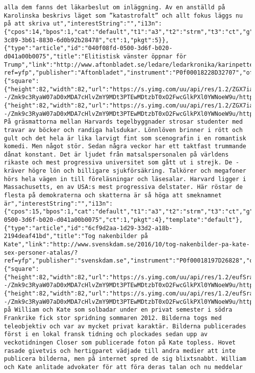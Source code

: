 \begin{verbatim}
alla dem fanns det läkarbeslut om inläggning. Av en anställd på Karolinska beskrivs läget som ”katastrofalt” och allt fokus läggs nu på att skriva ut","interestString":"","i13n":{"cpos":14,"bpos":1,"cat":"default","t1":"a3","t2":"strm","t3":"ct","g":"6266a514-3c89-3b61-8830-6d0b92b28478","ct":1,"pkgt":5}},{"type":"article","id":"040f08fd-0500-3d6f-b020-d041a00b0075","title":"Elitistisk vänster öppnar för Trump","link":"http://www.aftonbladet.se/ledare/ledarkronika/karinpettersson/article23796044.ab?ref=yfp","publisher":"Aftonbladet","instrument":"P0f00018228D32707","off_network":true,"images":{"square":{"height":82,"width":82,"url":"https://s.yimg.com/uu/api/res/1.2/ZGX7iaittAYy2niMtKGyXw--/Zmk9c3RyaW07aD0xMDA7cHlvZmY9MDt3PTEwMDtzbT0xO2FwcGlkPXl0YWNoeW9u/http://slingstone.zenfs.com/offnetwork/4ada25fa44dd3a6a9fbc4db85d35bab9","defer":1}},"image":{"height":82,"width":82,"url":"https://s.yimg.com/uu/api/res/1.2/ZGX7iaittAYy2niMtKGyXw--/Zmk9c3RyaW07aD0xMDA7cHlvZmY9MDt3PTEwMDtzbT0xO2FwcGlkPXl0YWNoeW9u/http://slingstone.zenfs.com/offnetwork/4ada25fa44dd3a6a9fbc4db85d35bab9","defer":1},"summary":"CAMBRIDGE På gräsmattorna mellan Harvards ­tegelbyggnader strosar studenter med travar av böcker och randiga halsdukar. Lönn­löven brinner i rött och gult och det hela är lika larvigt fint som scenografin i en ­romantisk komedi. Men något stör. Sedan ­några veckor har ett taktfast trummande dånat ­konstant. Det är ljudet från matsalspersonalen på världens rikaste och mest progressiva universitet som gått ut i strejk. De ­kräver högre lön och ­billigare sjukförsäkring. Talkörer och megafoner hörs hela vägen in till föreläsningar och läsesalar. Harvard ligger i Massachusetts, en av USA:s mest progressiva delstater. Här röstar de flesta på demo­kraterna och skatterna är så höga att smeknamnet är","interestString":"","i13n":{"cpos":15,"bpos":1,"cat":"default","t1":"a3","t2":"strm","t3":"ct","g":"040f08fd-0500-3d6f-b020-d041a00b0075","ct":1,"pkgt":4},"template":"default"},{"type":"article","id":"6cf9d2aa-1d29-33d2-a18b-2194deaf41bd","title":"Tog nakenbilder på Kate","link":"http://www.svenskdam.se/2016/10/tog-nakenbilder-pa-kate-sex-personer-atalas/?ref=yfp","publisher":"svenskdam.se","instrument":"P0f00018197D26828","off_network":true,"images":{"square":{"height":82,"width":82,"url":"https://s.yimg.com/uu/api/res/1.2/eufSraugDxuddLPVkyI7Fw--/Zmk9c3RyaW07aD0xMDA7cHlvZmY9MDt3PTEwMDtzbT0xO2FwcGlkPXl0YWNoeW9u/http://slingstone.zenfs.com/offnetwork/79d128f36edc04bc1f100d7128065e6e","defer":1}},"image":{"height":82,"width":82,"url":"https://s.yimg.com/uu/api/res/1.2/eufSraugDxuddLPVkyI7Fw--/Zmk9c3RyaW07aD0xMDA7cHlvZmY9MDt3PTEwMDtzbT0xO2FwcGlkPXl0YWNoeW9u/http://slingstone.zenfs.com/offnetwork/79d128f36edc04bc1f100d7128065e6e","defer":1},"summary":"Bilderna på William och Kate som solbadar under en privat semester i södra Frankrike fick stor spridning sommaren 2012. Bilderna togs med teleobjektiv och var av mycket privat karaktär. Bilderna publicerades först i en lokal fransk tidning och plockades sedan upp av veckotidningen Closer som publicerade foton på Kate topless. Hovet rasade givetvis och hertigparet vädjade till andra medier att inte publicera bilderna, men på internet spred de sig blixtsnabbt. William och Kate anlitade advokater för att föra deras talan och nu meddelar 
\end{verbatim}
